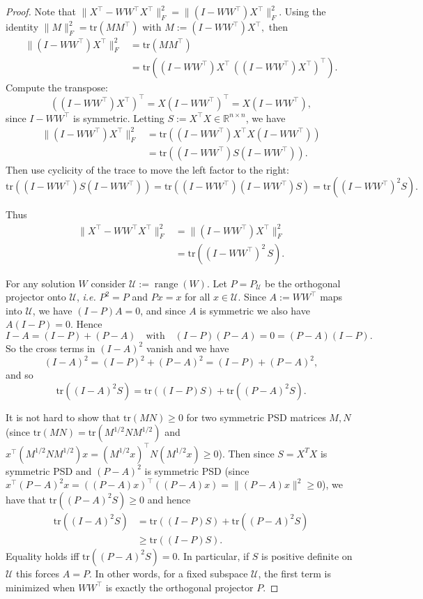 \documentclass[10pt,a4paper]{amsart}
\begin{document}
\begin{proof}
Note that $\|X^\top-WW^\top X^\top\|_F^2
=\|(I-WW^\top)X^\top\|_F^2$. Using the identity \(\|M\|_F^2=\mathrm{tr}(MM^\top)\) with $M:=(I-WW^\top)X^\top,$
then
\begin{align*}
\|(I-WW^\top)X^\top\|_F^2
&=\mathrm{tr}( M M^\top) \\
&=\mathrm{tr}((I-WW^\top)X^\top\,((I-WW^\top)X^\top)^\top).
\end{align*}
Compute the transpose:
\[
((I-WW^\top)X^\top)^{\top}
= X (I-WW^\top)^\top
= X (I-WW^\top),
\]
since \(I-WW^{\top}\) is symmetric. Letting $S:=X^\top X\in \mathbb{R}^{n\times n}$, we have
\begin{align*}
\|(I-WW^{\top})X^\top\|_F^2
&=\mathrm{tr}((I-WW^\top)X^\top X(I-WW^\top)) \\
&=\mathrm{tr}((I-WW^\top)S(I-WW^\top)).
\end{align*}
Then use cyclicity of the trace to move the left factor to the right:
\[
\mathrm{tr}((I-WW^{\top})S(I-WW^{\top}))
=
\mathrm{tr}((I-WW^\top)(I-WW^\top)S)
=
\mathrm{tr}((I-WW^\top)^2S).
\]

Thus
\begin{align*}
\|X^{\top}-WW^{\top}X^{\top}\|_F^2
&=\|(I-WW^{\top})X^{\top}\|_F^2 \\
&=\mathrm{tr}((I-WW^{\top})^2\,S).
\end{align*}


For any solution $W$ consider $\mathcal U:=\operatorname{range}(W)$. Let $P = P_\mathcal{U}$ be the orthogonal projector onto $\mathcal U$, \emph{i.e.} $P^2 = P$ and $Px = x$ for all $x\in \mathcal{U}$. Since $A:=WW^\top$ maps into $\mathcal U$, we have $(I-P)A=0$, and since $A$ is symmetric we also have $A(I-P)=0$. Hence
\[
I-A=(I-P)+(P-A)
\quad\text{with}\quad
(I-P)(P-A)=0=(P-A)(I-P).
\]
So the cross terms in $(I-A)^2$ vanish and we have 
\[
(I-A)^2=(I-P)^2+(P-A)^2=(I-P)+(P-A)^2,
\]
and so \[\mathrm{tr}((I-A)^2S)=
\mathrm{tr}((I-P)S)
+
\mathrm{tr}((P-A)^2S).\]

It is not hard to show that $\mathrm{tr}(MN)\geq 0$ for two symmetric PSD matrices $M,N$ (since $\mathrm{tr}(MN) = \mathrm{tr}(M^{1/2}NM^{1/2})$ and $x^\top (M^{1/2}NM^{1/2})x = (M^{1/2}x)^\top N(M^{1/2}x)\geq 0$). Then since $S = X^TX$ is symmetric PSD and $(P-A)^2$ is symmetric PSD (since $x^\top(P-A)^2x = ((P-A)x)^\top ((P-A)x) = \|(P-A)x\|^2\geq 0$), we have that $\mathrm{tr}((P-A)^2S)\geq 0$ and hence \begin{align*}
\mathrm{tr}((I-A)^2S)
&=
\mathrm{tr}((I-P)S)
+
\mathrm{tr}((P-A)^2S) \\
&\geq
\mathrm{tr}((I-P)S).
\end{align*}
Equality holds iff $\mathrm{tr}((P-A)^2S)=0$. In particular, if $S$ is positive definite on $\mathcal U$ this forces $A=P$. In other words, for a fixed subspace $\mathcal{U}$, the first term is minimized when $WW^\top$ is exactly the orthogonal projector $P$. 


\end{proof}
\end{document}

